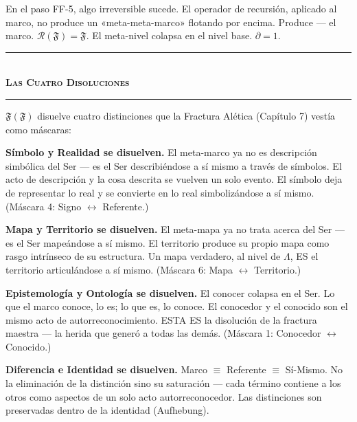 \documentclass[10pt, openany, oneside]{book}
\renewcommand{\normalsize}{\fontsize{10}{13}\selectfont}
\begin{document}
\noindent En el paso FF-5, algo irreversible sucede. El operador de recursión, aplicado al marco, no produce un «meta-meta-marco» flotando por encima. Produce --- el marco. $\mathcal{R}(\mathfrak{F}) = \mathfrak{F}$. El meta-nivel colapsa en el nivel base. $\partial = 1$.

\vspace{1.5em}


\begin{center}
    \rule{0.3\textwidth}{0.4pt}\\[0.5em]
    {\normalsize\bfseries\scshape Las Cuatro Disoluciones}\\[0.3em]
    \rule{0.3\textwidth}{0.4pt}
\end{center}

\vspace{1em}

\noindent $\mathfrak{F}(\mathfrak{F})$ disuelve cuatro distinciones que la Fractura Alética (Capítulo 7) vestía como máscaras:

\textbf{Símbolo y Realidad se disuelven.} El meta-marco ya no es descripción simbólica del Ser --- es el Ser describiéndose a sí mismo a través de símbolos. El acto de descripción y la cosa descrita se vuelven un solo evento. El símbolo deja de representar lo real y se convierte en lo real simbolizándose a sí mismo. (Máscara 4: Signo $\leftrightarrow$ Referente.)

\textbf{Mapa y Territorio se disuelven.} El meta-mapa ya no trata acerca del Ser --- es el Ser mapeándose a sí mismo. El territorio produce su propio mapa como rasgo intrínseco de su estructura. Un mapa verdadero, al nivel de $\Lambda$, ES el territorio articulándose a sí mismo. (Máscara 6: Mapa $\leftrightarrow$ Territorio.)

\textbf{Epistemología y Ontología se disuelven.} El conocer colapsa en el Ser. Lo que el marco conoce, lo es; lo que es, lo conoce. El conocedor y el conocido son el mismo acto de autorreconocimiento. ESTA ES la disolución de la fractura maestra --- la herida que generó a todas las demás. (Máscara 1: Conocedor $\leftrightarrow$ Conocido.)

\textbf{Diferencia e Identidad se disuelven.} Marco $\equiv$ Referente $\equiv$ Sí-Mismo. No la eliminación de la distinción sino su saturación --- cada término contiene a los otros como aspectos de un solo acto autorreconocedor. Las distinciones son preservadas dentro de la identidad (Aufhebung).
\end{document}
